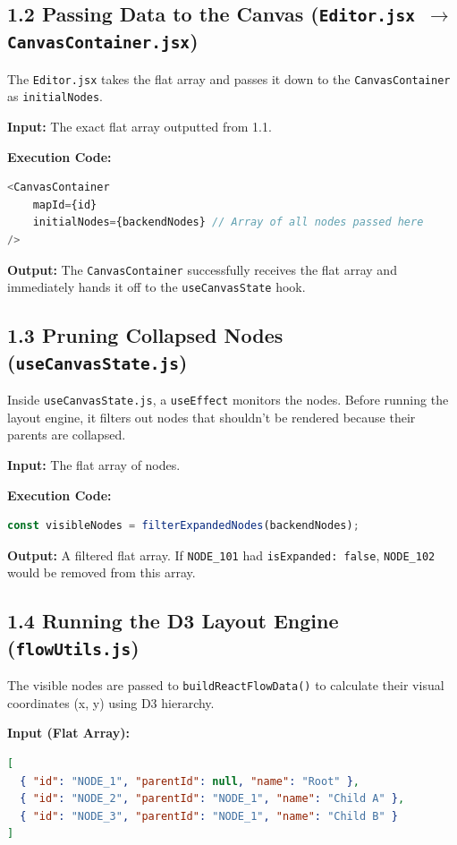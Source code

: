 \documentclass[12pt, a4paper]{article}
\begin{document}
\subsection{1.2 Passing Data to the Canvas (\texttt{Editor.jsx $\rightarrow$ CanvasContainer.jsx})}
The \texttt{Editor.jsx} takes the flat array and passes it down to the \texttt{CanvasContainer} as \texttt{initialNodes}.

\textbf{Input:}
The exact flat array outputted from 1.1.

\textbf{Execution Code:}
\begin{lstlisting}[language=javascript, caption={Editor.jsx}]
<CanvasContainer 
    mapId={id} 
    initialNodes={backendNodes} // Array of all nodes passed here
/>
\end{lstlisting}

\textbf{Output:} 
The \texttt{CanvasContainer} successfully receives the flat array and immediately hands it off to the \texttt{useCanvasState} hook.

\subsection{1.3 Pruning Collapsed Nodes (\texttt{useCanvasState.js})}
Inside \texttt{useCanvasState.js}, a \texttt{useEffect} monitors the nodes. Before running the layout engine, it filters out nodes that shouldn't be rendered because their parents are collapsed.

\textbf{Input:}
The flat array of nodes.

\textbf{Execution Code:}
\begin{lstlisting}[language=javascript, caption={useCanvasState.js}]
const visibleNodes = filterExpandedNodes(backendNodes);
\end{lstlisting}

\textbf{Output:}
A filtered flat array. If \texttt{NODE_101} had \texttt{isExpanded: false}, \texttt{NODE_102} would be removed from this array.

\subsection{1.4 Running the D3 Layout Engine (\texttt{flowUtils.js})}
The visible nodes are passed to \texttt{buildReactFlowData()} to calculate their visual coordinates (x, y) using D3 hierarchy.

\textbf{Input (Flat Array):}
\begin{lstlisting}[language=json]
[
  { "id": "NODE_1", "parentId": null, "name": "Root" },
  { "id": "NODE_2", "parentId": "NODE_1", "name": "Child A" },
  { "id": "NODE_3", "parentId": "NODE_1", "name": "Child B" }
]
\end{lstlisting}
\end{document}
